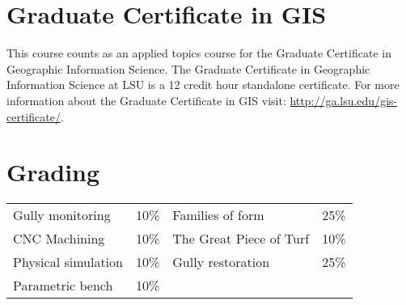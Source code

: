 \documentclass[11pt,article,oneside]{memoir}
\begin{document}
\section{Graduate Certificate in GIS}
This course counts as an applied topics course for the 
Graduate Certificate in Geographic Information Science.
The Graduate Certificate in Geographic Information Science at LSU 
is a 12 credit hour standalone certificate. 
For more information about the Graduate Certificate in GIS visit: 
\url{http://ga.lsu.edu/gis-certificate/}.

\section{Grading}
%
\begin{table}[H]
\begin{tabular}{l r @{\hskip 2cm} l @{\hskip 0.5cm} l}
%
Gully monitoring & 10\% & Families of form & 25\% \\
CNC Machining & 10\% & The Great Piece of Turf & 10\% \\
Physical simulation & 10\% & Gully restoration & 25\% \\
Parametric bench & 10\% \\
%
\end{tabular}
\end{table}

\clearpage

\end{document}
